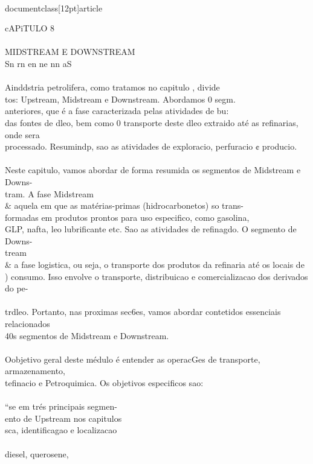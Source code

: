 \\documentclass[12pt]{article}
\begin{document}
cAPiTULO 8\\
\\
MIDSTREAM E DOWNSTREAM\\
Sn rn en ne nn aS\\
\\
Ainddstria petrolifera, como tratamos no capitulo , divide\\
tos: Upstream, Midstream e Downstream. Abordamos 0 segm.\\
anteriores, que é a fase caracterizada pelas atividades de bu:\\
das fontes de dleo, bem como 0 transporte deste dleo extraido até as refinarias, onde sera\\
processado. Resumindp, sao as atividades de exploracio, perfuracio ¢ producio.\\
\\
Neste capitulo, vamos abordar de forma resumida os segmentos de Midstream e Downs-\\
tram. A fase Midstream \\& aquela em que as matérias-primas (hidrocarbonetos) so trans-\\
formadas em produtos prontos para uso especifico, como gasolina,\\
GLP, nafta, leo lubrificante etc. Sao as atividades de refinagdo. O segmento de Downs-\\
tream \\& a fase logistica, ou seja, o transporte dos produtos da refinaria até os locais de\\
) consumo. Isso envolve o transporte, distribuicao e comercializacao dos derivados do pe-\\
\\
trdleo. Portanto, nas proximas sec6es, vamos abordar contetidos essenciais relacionados\\
40s segmentos de Midstream e Downstream.\\
\\
Oobjetivo geral deste médulo é entender as operacGes de transporte, armazenamento,\\
tefinacio e Petroquimica. Os objetivos especificos sao:\\
\\
“se em trés principais segmen-\\
ento de Upstream nos capitulos\\
sca, identificagao e localizacao\\
\\
diesel, querosene,\\
\\
\end{document}
